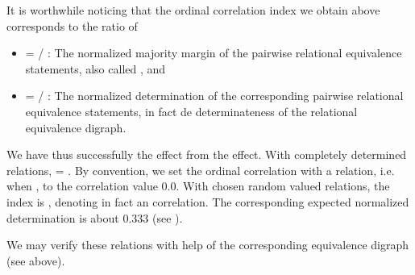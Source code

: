 \documentclass[a4paper,10pt,english]{sphinxhowto}
\begin{document}
It is worthwhile noticing that the ordinal correlation index  we obtain above corresponds to the ratio of
\begin{itemize}
\item {} 
 =  / : The normalized majority margin of the pairwise relational equivalence statements, also called , and

\item {} 
 =  / : The normalized determination of the corresponding pairwise relational equivalence statements, in fact de determinateness of the relational equivalence digraph.

\end{itemize}

We have thus successfully  the  effect from the  effect. With completely determined relations,  = . By convention, we set the ordinal correlation with a  relation, i.e. when , to the  correlation value 0.0. With  chosen random \sphinxhyphen{}valued relations, the   index is , denoting in fact an  correlation. The corresponding expected normalized determination  is about 0.333 (see ).

We may verify these relations with help of the corresponding equivalence digraph  (see above).

\begin{sphinxVerbatim}[commandchars=\\\{\},numbers=left,firstnumber=1,stepnumber=1]
\end{sphinxVerbatim}
\end{document}

